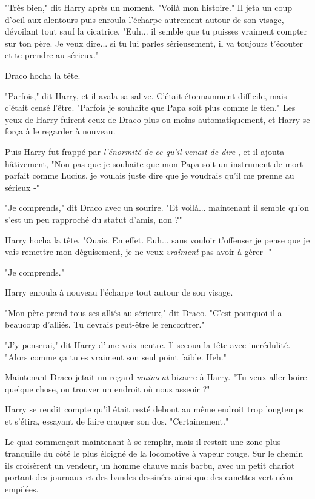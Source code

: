 "Très bien," dit Harry après un moment. "Voilà mon histoire." Il jeta un coup d'oeil aux alentours puis enroula l'écharpe autrement autour de son visage, dévoilant tout sauf la cicatrice. "Euh... il semble que tu puisses vraiment compter sur ton père. Je veux dire... si tu lui parles sérieusement, il va toujours t'écouter et te prendre au sérieux."

Draco hocha la tête.

"Parfois," dit Harry, et il avala sa salive. C'était étonnamment difficile, mais c'était censé l'être. "Parfois je souhaite que Papa soit plus comme le tien." Les yeux de Harry fuirent ceux de Draco plus ou moins automatiquement, et Harry se força à le regarder à nouveau.

Puis Harry fut frappé par \emph{l'énormité de ce qu'il venait de dire} , et il ajouta hâtivement, "Non pas que je souhaite que mon Papa soit un instrument de mort parfait comme Lucius, je voulais juste dire que je voudrais qu'il me prenne au sérieux -"

"Je comprends," dit Draco avec un sourire. "Et voilà... maintenant il semble qu'on s'est un peu rapproché du statut d'amis, non ?"

Harry hocha la tête. "Ouais. En effet. Euh... sans vouloir t'offenser je pense que je vais remettre mon déguisement, je ne veux \emph{vraiment}  pas avoir à gérer -"

"Je comprends."

Harry enroula à nouveau l'écharpe tout autour de son visage.

"Mon père prend tous ses alliés au sérieux," dit Draco. "C'est pourquoi il a beaucoup d'alliés. Tu devrais peut-être le rencontrer."

"J'y penserai," dit Harry d'une voix neutre. Il secoua la tête avec incrédulité. "Alors comme ça tu es vraiment son seul point faible. Heh."

Maintenant Draco jetait un regard \emph{vraiment}  bizarre à Harry. "Tu veux aller boire quelque chose, ou trouver un endroit où nous asseoir ?"

Harry se rendit compte qu'il était resté debout au même endroit trop longtemps et s'étira, essayant de faire craquer son dos. "Certainement."

Le quai commençait maintenant à se remplir, mais il restait une zone plus tranquille du côté le plus éloigné de la locomotive à vapeur rouge. Sur le chemin ils croisèrent un vendeur, un homme chauve mais barbu, avec un petit chariot portant des journaux et des bandes dessinées ainsi que des canettes vert néon empilées.

